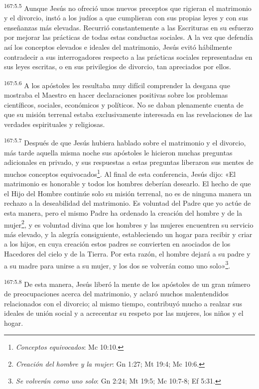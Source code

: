 \par 
\textsuperscript{167:5.5} Aunque Jesús no ofreció unos nuevos preceptos que rigieran el matrimonio y el divorcio, instó a los judíos a que cumplieran con sus propias leyes y con sus enseñanzas más elevadas. Recurrió constantemente a las Escrituras en su esfuerzo por mejorar las prácticas de todas estas conductas sociales. A la vez que defendía así los conceptos elevados e ideales del matrimonio, Jesús evitó hábilmente contradecir a sus interrogadores respecto a las prácticas sociales representadas en sus leyes escritas, o en sus privilegios de divorcio, tan apreciados por ellos.

\par 
\textsuperscript{167:5.6} A los apóstoles les resultaba muy difícil comprender la desgana que mostraba el Maestro en hacer declaraciones positivas sobre los problemas científicos, sociales, económicos y políticos. No se daban plenamente cuenta de que su misión terrenal estaba exclusivamente interesada en las revelaciones de las verdades espirituales y religiosas.

\par 
\textsuperscript{167:5.7} Después de que Jesús hubiera hablado sobre el matrimonio y el divorcio, más tarde aquella misma noche sus apóstoles le hicieron muchas preguntas adicionales en privado, y sus respuestas a estas preguntas liberaron sus mentes de muchos conceptos equivocados\footnote{\textit{Conceptos equivocados}: Mc 10:10.}. Al final de esta conferencia, Jesús dijo: «El matrimonio es honorable y todos los hombres deberían desearlo. El hecho de que el Hijo del Hombre continúe solo su misión terrenal, no es de ninguna manera un rechazo a la deseabilidad del matrimonio. Es voluntad del Padre que yo actúe de esta manera, pero el mismo Padre ha ordenado la creación del hombre y de la mujer\footnote{\textit{Creación del hombre y la mujer}: Gn 1:27; Mt 19:4; Mc 10:6.}, y es voluntad divina que los hombres y las mujeres encuentren su servicio más elevado, y la alegría consiguiente, estableciendo un hogar para recibir y criar a los hijos, en cuya creación estos padres se convierten en asociados de los Hacedores del cielo y de la Tierra. Por esta razón, el hombre dejará a su padre y a su madre para unirse a su mujer, y los dos se volverán como uno solo»\footnote{\textit{Se volverán como uno solo}: Gn 2:24; Mt 19:5; Mc 10:7-8; Ef 5:31.}.

\par 
\textsuperscript{167:5.8} De esta manera, Jesús liberó la mente de los apóstoles de un gran número de preocupaciones acerca del matrimonio, y aclaró muchos malentendidos relacionados con el divorcio; al mismo tiempo, contribuyó mucho a realzar sus ideales de unión social y a acrecentar su respeto por las mujeres, los niños y el hogar.

